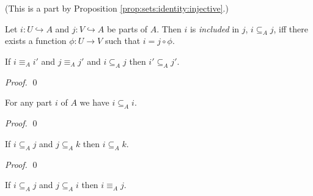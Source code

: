 (This is a part by Proposition \ref{prop:sets:identity:injective}.)

\begin{df}[Inclusion]
 Let $i : U \hookrightarrow A$ and $j : V \hookrightarrow A$ be parts of $A$.
 Then $i$ is \emph{included} in $j$, $i \subseteq_A j$, iff there exists a
 function $\phi : U \rightarrow V$ such that $i = j \circ \phi$.
\end{df}

\begin{prop}
  If $i \equiv_A i'$ and $j \equiv_A j'$ and $i \subseteq_A j$ then $i' \subseteq_A j'$.
\end{prop}

\begin{proof}
  \pf
  \qed
\end{proof}

\begin{prop}
  For any part $i$ of $A$ we have $i \subseteq_A i$.
\end{prop}

\begin{proof}
  \pf
  \qed
\end{proof}

\begin{prop}
  If $i \subseteq_A j$ and $j \subseteq_A k$ then $i \subseteq_A k$.
\end{prop}

\begin{proof}
  \pf
  \qed
\end{proof}

\begin{prop}
  If $i \subseteq_A j$ and $j \subseteq_A i$ then $i \equiv_A j$.
\end{prop}

